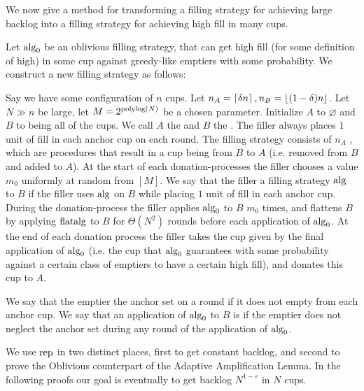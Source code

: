 We now give a method for transforming a filling strategy for
achieving large backlog into a filling strategy for achieving
high fill in many cups.
\begin{definition}
  \label{def:TO_rep}
  {\normalfont
  Let $\operatorname{\text{\textup{alg}}}_0$ be an oblivious filling strategy, that can get
  high fill (for some definition of high) in some cup against
  greedy-like emptiers with some probability. We construct a new
  filling strategy  as follows:

  Say we have some configuration of $n$ cups.
  Let $n_A = \left\lceil \delta n \right\rceil, n_B = \left\lfloor (1-\delta)n \right\rfloor$. Let $N
  \gg n$ be large, let $M=2^{\operatorname{\text{polylog}}(N)}$ be a chosen parameter. 
  Initialize $A$ to $\varnothing$ and $B$ to
  being all of the cups. We call $A$ the  and
  $B$ the . The filler always places $1$
  unit of fill in each anchor cup on each round. The filling
  strategy consists of $n_A$ , which are
  procedures that result in a cup being  from $B$
  to $A$ (i.e. removed from $B$ and added to $A$). At the start
  of each donation-processes the filler chooses a value $m_0$
  uniformly at random from $[M]$. We say that the filler
   a filling strategy $\operatorname{\text{\textup{alg}}}$ to $B$ if the
  filler uses $\operatorname{\text{\textup{alg}}}$ on $B$ while placing $1$ unit of fill
  in each anchor cup. During the donation-process the filler
  applies $\operatorname{\text{\textup{alg}}}_0$ to $B$ $m_0$ times, and flattens $B$ by
  applying $\operatorname{\text{\textup{flatalg}}}$ to $B$ for $\Theta(N^2)$ rounds before each
  application of $\operatorname{\text{\textup{alg}}}_0$. At the end of each donation process
  the filler takes the cup given by the final application of
  $\operatorname{\text{\textup{alg}}}_0$ (i.e. the cup that $\operatorname{\text{\textup{alg}}}_0$ guarantees with some
  probability against a certain class of emptiers to have a
  certain high fill), and donates this cup to $A$. 

We say that the emptier  the anchor set on a round
if it does not empty from each anchor cup. We say that an
application of $\operatorname{\text{\textup{alg}}}_0$ to $B$ is  if
the emptier does not neglect the anchor set during any round of
the application of $\operatorname{\text{\textup{alg}}}_0$.
}

\end{definition}

We use $\operatorname{\text{\textup{rep}}}$ in two distinct places, first to get constant
backlog, and second to prove the Oblivious counterpart of the
Adaptive Amplification Lemma.
In the following proofs our goal is eventually to get backlog
$N^{1-\varepsilon}$ in $N$ cups. 

